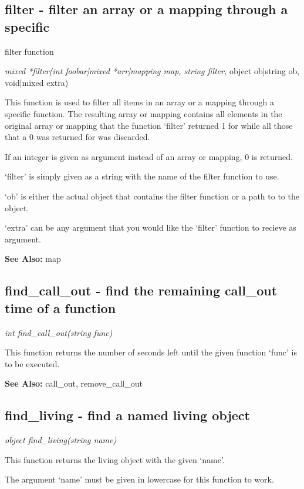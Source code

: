 \subsection{filter - filter an array or a mapping through a specific }
         filter function

    {\em mixed *filter(int foobar|mixed *arr|mapping map, string filter, }
                object ob|string ob, void|mixed extra)

    This function is used to filter all items in an array or a mapping
    through a specific function. The resulting array or mapping contains
    all elements in the original array or mapping that the function
    `filter' returned 1 for while all those that a 0 was returned for
    was discarded.

    If an integer is given as argument instead of an array or mapping,
    0 is returned.

    `filter' is simply given as a string with the name of the filter
    function to use.

    `ob' is either the actual object that contains the filter function
    or a path to to the object.

    `extra' can be any argument that you would like the `filter' 
    function to recieve as argument.

    {\bf See Also: }    map



\subsection{find\_call\_out - find the remaining call\_out time of a function}

    {\em int find\_call\_out(string func)}

    This function returns the number of seconds left until the given
    function `func' is to be executed.

    {\bf See Also: }    call\_out, remove\_call\_out



\subsection{find\_living - find a named living object}

    {\em object find\_living(string name)}

    This function returns the living object with the given `name'.

    The argument `name' must be given in lowercase for this function
    to work.

